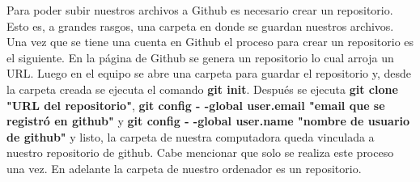 \documentclass[letter paper, 12pt, oneside]{article}
\begin{document}
Para poder subir nuestros archivos a Github es necesario crear un repositorio. Esto es, a grandes rasgos, una carpeta en donde se guardan nuestros archivos. Una vez que se tiene una cuenta en Github el proceso para crear un repositorio es el siguiente. En la página de Github se genera un repositorio lo cual arroja un URL. Luego en el equipo se abre una carpeta para guardar el repositorio y, desde la carpeta creada se ejecuta el comando \textbf{git init}. Después se ejecuta \textbf{git clone "URL del repositorio"}, \textbf{git config - -global user.email "email que se registró en github"} y \textbf{git config - -global user.name "nombre de usuario de github"} y listo, la carpeta de nuestra computadora queda vinculada a nuestro repositorio de github. Cabe mencionar que solo se realiza este proceso una vez. En adelante la carpeta de nuestro ordenador es un repositorio.  
\end{document}
